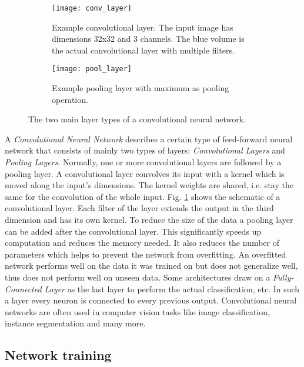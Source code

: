 \begin{figure}[!tbp]
	\centering
	\begin{subfigure}[t]{0.45\textwidth}
		\centering
    	\texttt{[image: conv\_layer]}
    	\caption{Example convolutional layer. The input image has dimensions 32x32 and 3 channels. The blue volume is the actual convolutional layer with multiple filters.}
    	\label{fig:conv_layer}
	\end{subfigure}
	\hfill
	\begin{subfigure}[t]{0.5\textwidth}
		\centering
    	\texttt{[image: pool\_layer]}
    	\caption{Example pooling layer with maximum as pooling operation.}
    	\label{fig:pool_layer}
	\end{subfigure}
	\caption{The two main layer types of a convolutional neural network.}
\end{figure} 

A \textit{Convolutional Neural Network} describes a certain type of feed-forward neural network that consists of mainly two types of layers: \textit{Convolutional Layers} and \textit{Pooling Layers}. Normally, one or more convolutional layers are followed by a pooling layer. A convolutional layer convolves its input with a kernel which is moved along the input's dimensions. The kernel weights are shared, i.e. stay the same for the convolution of the whole input. Fig. \ref{fig:conv_layer} shows the schematic of a convolutional layer. Each filter of the layer extends the output in the third dimension and has its own kernel. To reduce the size of the data a pooling layer can be added after the convolutional layer. This significantly speeds up computation and reduces the memory needed. It also reduces the number of parameters which helps to prevent the network from overfitting. An overfitted network performs well on the data it was trained on but does not generalize well, thus does not perform well on unseen data. Some architectures draw on a \textit{Fully-Connected Layer} as the last layer to perform the actual classification, etc. In such a layer every neuron is connected to every previous output. Convolutional neural networks are often used in computer vision tasks like image classification, instance segmentation and many more.

\subsection{Network training} \label{section:network_training}

